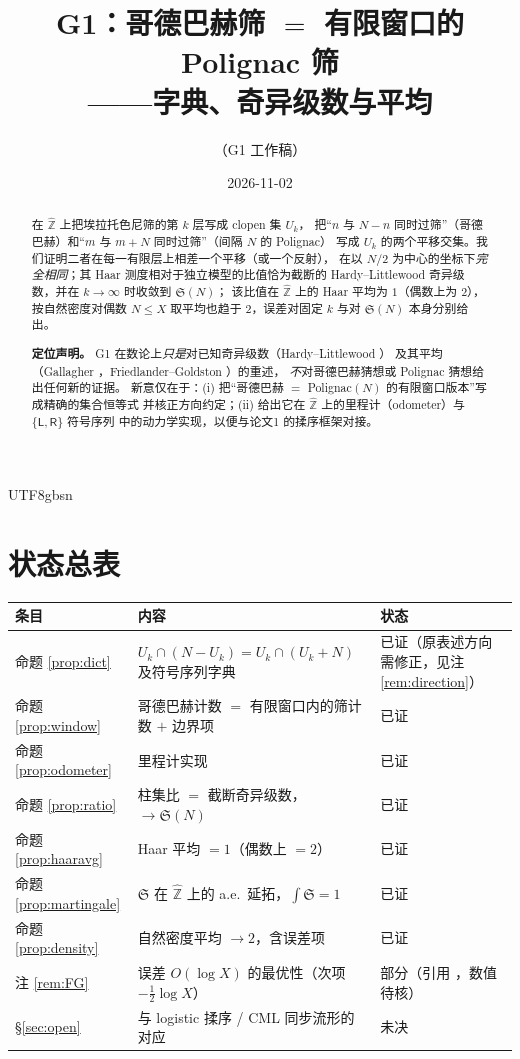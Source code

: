 \documentclass[11pt,a4paper]{article}
\newcommand{\Zhat}{\widehat{\mathbb Z}}
\newcommand{\Sing}{\mathfrak S}
\newcommand{\Lsym}{\ensuremath{\mathsf{L}}}
\newcommand{\Rsym}{\ensuremath{\mathsf{R}}}
\theoremstyle{plain}
\theoremstyle{definition}
\begin{document}
\begin{CJK}{UTF8}{gbsn}

\title{G1：哥德巴赫筛 $=$ 有限窗口的 Polignac 筛\\[2pt]
\large ——{}字典、奇异级数与平均}
\author{（G1 工作稿）}
\date{2026-11-02}
\maketitle

\begin{abstract}
在 $\Zhat$ 上把埃拉托色尼筛的第 $k$ 层写成 clopen 集 $U_k$，
把“$n$ 与 $N-n$ 同时过筛”（哥德巴赫）和“$m$ 与 $m+N$ 同时过筛”（间隔 $N$ 的 Polignac）
写成 $U_k$ 的两个平移交集。我们证明二者在每一有限层上相差一个平移（或一个反射），
在以 $N/2$ 为中心的坐标下\emph{完全相同}；其 Haar 测度相对于独立模型的比值恰为截断的
Hardy--Littlewood 奇异级数，并在 $k\to\infty$ 时收敛到 $\Sing(N)$；
该比值在 $\Zhat$ 上的 Haar 平均为 $1$（偶数上为 $2$），按自然密度对偶数 $N\le X$
取平均也趋于 $2$，误差对固定 $k$ 与对 $\Sing(N)$ 本身分别给出。

\textbf{定位声明。} G1 在数论上\emph{只是}对已知奇异级数（Hardy--Littlewood \cite{HL23}）
及其平均（Gallagher \cite{Gal76}，Friedlander--Goldston \cite{FG95}）的重述，
\emph{不}对哥德巴赫猜想或 Polignac 猜想给出任何新的证据。
新意仅在于：(i) 把“哥德巴赫 $=$ Polignac$(N)$ 的有限窗口版本”写成精确的集合恒等式
并核正方向约定；(ii) 给出它在 $\Zhat$ 上的里程计（odometer）与 $\{\Lsym,\Rsym\}$ 符号序列
中的动力学实现，以便与论文1 \cite{Wang26} 的揉序框架对接。
\end{abstract}

\section*{状态总表}
\begin{center}
\begin{tabular}{p{2.6cm}p{7.2cm}p{4.6cm}}
\hline
条目 & 内容 & 状态\\
\hline
命题 \ref{prop:dict} & $U_k\cap(N-U_k)=U_k\cap(U_k+N)$ 及符号序列字典 & 已证（原表述方向需修正，见注 \ref{rem:direction}）\\
命题 \ref{prop:window} & 哥德巴赫计数 $=$ 有限窗口内的筛计数 $+$ 边界项 & 已证\\
命题 \ref{prop:odometer} & 里程计实现 & 已证\\
命题 \ref{prop:ratio} & 柱集比 $=$ 截断奇异级数，$\to\Sing(N)$ & 已证\\
命题 \ref{prop:haaravg} & Haar 平均 $=1$（偶数上 $=2$） & 已证\\
命题 \ref{prop:martingale} & $\Sing$ 在 $\Zhat$ 上的 a.e.\ 延拓，$\int\Sing=1$ & 已证\\
命题 \ref{prop:density} & 自然密度平均 $\to 2$，含误差项 & 已证\\
注 \ref{rem:FG} & 误差 $O(\log X)$ 的最优性（次项 $-\tfrac12\log X$） & 部分（引用 \cite{FG95}，数值待核）\\
\S\ref{sec:open} & 与 logistic 揉序 / CML 同步流形的对应 & 未决\\
\hline
\end{tabular}
\end{center}


\end{CJK}
\end{document}
